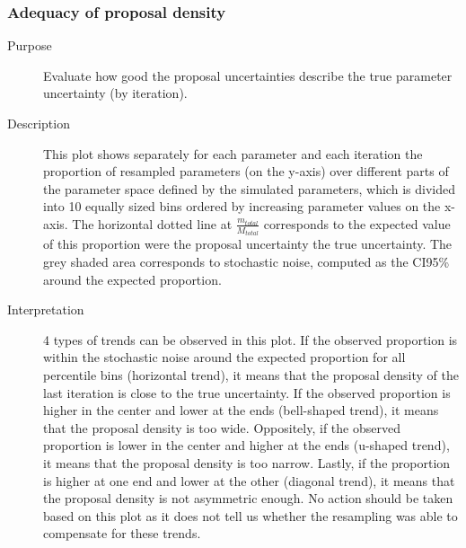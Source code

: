 \subsubsection{Adequacy of proposal density}
\begin{description}
\item[Purpose] Evaluate how good the proposal uncertainties describe the true parameter uncertainty (by iteration).
\item[Description] This plot shows separately for each parameter and each iteration the proportion of resampled parameters (on the y-axis) over different parts of the parameter space defined by the simulated parameters, which is divided into 10 equally sized bins ordered by increasing parameter values on the x-axis.
The horizontal dotted line at $\frac{m_{total}}{M_{total}}$
corresponds to the expected value of this proportion were the proposal uncertainty the true uncertainty. The grey shaded area corresponds to stochastic noise, computed as the CI95\%
around the expected proportion.
\item[Interpretation] 4 types of trends can be observed in this plot. If the observed proportion is within the stochastic noise around the expected proportion for all percentile bins (horizontal trend), it means that the proposal density of the last iteration is close to the true uncertainty. If the observed proportion is higher in the center and lower at the ends (bell-shaped trend), it means that the proposal density is too wide. Oppositely, if the observed proportion is lower in the center and higher at the ends (u-shaped trend), it means that the proposal density is too narrow. Lastly, if the proportion is higher at one end and lower at the other (diagonal trend), it means that the proposal density is not asymmetric enough. No action should be taken based on this plot as it does not tell us whether the resampling was able to compensate for these trends.
\end{description}


